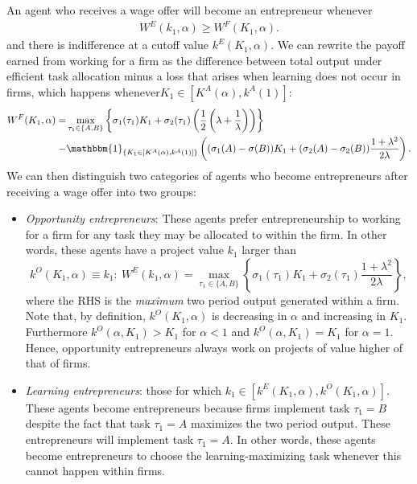 \documentclass[12pt,american]{paper}
\theoremstyle{remark}
\begin{document}
An agent who receives a wage offer will become an entrepreneur whenever 
  \begin{align*}
 W^E(k_1,\alpha) \geq  W^F (K_1, \alpha).
 \end{align*}
and there is indifference at a cutoff value $k^E (K_1,\alpha)$. We can rewrite the payoff earned from working for a firm as the difference between total output under efficient task allocation minus a loss that arises when learning does not occur in firms, which happens whenever$ K_1 \in [K^A(\alpha), k^A(1)] $:
 \begin{align*}
 W^F (K_1, \alpha) =  &\max_{\tau_1\in\{A,B\}} \left\lbrace  \sigma_1(\tau_1) K_1+  \sigma_2(\tau_1)  \left(  \frac{1}{2} \left( \lambda + \frac{1}{\lambda} \right)\right) \right\rbrace \\ - &\mathbbm{1}_{\left\lbrace K_1 \in [K^A(\alpha), k^A(1)] \right\rbrace} \left( ( \sigma_1(A) - \sigma(B)) K_1+  (\sigma_2(A) - \sigma_2(B))    \frac{1+\lambda^2}{2\lambda}\right).
\end{align*}
We can then distinguish two categories of agents who become entrepreneurs after receiving a wage offer into two groups:
\begin{itemize}
\item \emph{Opportunity entrepreneurs}: These agents prefer entrepreneurship to working for a firm for any task they may be allocated to within the firm. In other words, these agents have a project value $k_1$ larger than  
\[
k^O (K_1,\alpha)\equiv k_1: ~  W^E(k_1,\alpha) = \max_{\tau_1\in\{A,B\}} \left\lbrace  \sigma_1(\tau_1) K_1+  \sigma_2(\tau_1) \frac{1+\lambda^2}{2\lambda} \right\rbrace,
\]
where the RHS is the \emph{maximum} two period output generated within a firm. Note that, by definition, $k^O( K_1, \alpha)$ is decreasing in $\alpha$ and increasing in $K_1$. Furthermore $k^O(\alpha, K_1) > K_1$ for  $\alpha<1$ and $k^O(\alpha, K_1) = K_1$ for $\alpha=1$. Hence, opportunity entrepreneurs always work on projects of value higher of that of firms.
\item \emph{Learning entrepreneurs}: those for which $k_1 \in [k^E (K_1,\alpha), k^O (K_1,\alpha)]$. These agents become entrepreneurs because firms implement task $\tau_1=B$ despite the fact that task $\tau_1=A$ maximizes the two period output. These entrepreneurs will implement task $\tau_1=A$. In other words, these agents become entrepreneurs to choose the learning-maximizing task whenever this cannot happen within firms. 
\end{itemize}
\end{document}
